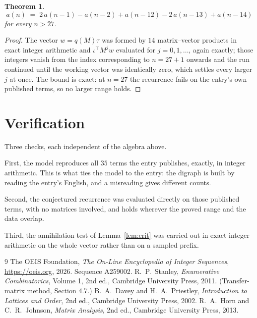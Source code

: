 \documentclass[11pt,a4paper]{article}
\theoremstyle{plain}
\newtheorem{theorem}{Theorem}
\theoremstyle{definition}
\begin{document}
\begin{theorem}
\[
a(n)\;=\;2\,a(n-1) - a(n-2) + a(n-12) - 2\,a(n-13) + a(n-14)
\]
for every $n>27$.
\end{theorem}

\begin{proof}
The vector $w=q(M)\tau$ was formed by $14$ matrix--vector products in exact integer
arithmetic and $\iota^{\!\top}M^{j}w$ evaluated for $j=0,1,\dots$, again exactly; those
integers vanish from the index corresponding to $n=27+1$ onwards and the run continued
until the working vector was identically zero, which settles every larger $j$ at once. The bound is exact: at $n=27$ the recurrence fails on the entry's own published terms, so no larger range holds.
\end{proof}

\section{Verification}

Three checks, each independent of the algebra above.

First, the model reproduces all $35$ terms the entry publishes, exactly, in integer
arithmetic. This is what ties the model to the entry: the digraph is built by reading the
entry's English, and a misreading gives different counts.

Second, the conjectured recurrence was evaluated directly on those published terms, with no
matrices involved, and holds wherever the proved range and the data overlap.

Third, the annihilation test of Lemma~\ref{lem:crit} was carried out in exact integer
arithmetic on the whole vector rather than on a sampled prefix.

\begin{thebibliography}{9}
 The OEIS Foundation, \emph{The On-Line Encyclopedia of Integer
Sequences}, \url{https://oeis.org}, 2026. Sequence A259002.
 R.~P.~Stanley, \emph{Enumerative Combinatorics}, Volume 1, 2nd ed.,
Cambridge University Press, 2011. (Transfer-matrix method, Section 4.7.)
 B.~A.~Davey and H.~A.~Priestley, \emph{Introduction to Lattices and
Order}, 2nd ed., Cambridge University Press, 2002.
 R.~A.~Horn and C.~R.~Johnson, \emph{Matrix Analysis}, 2nd ed., Cambridge
University Press, 2013.
\end{thebibliography}
\end{document}
